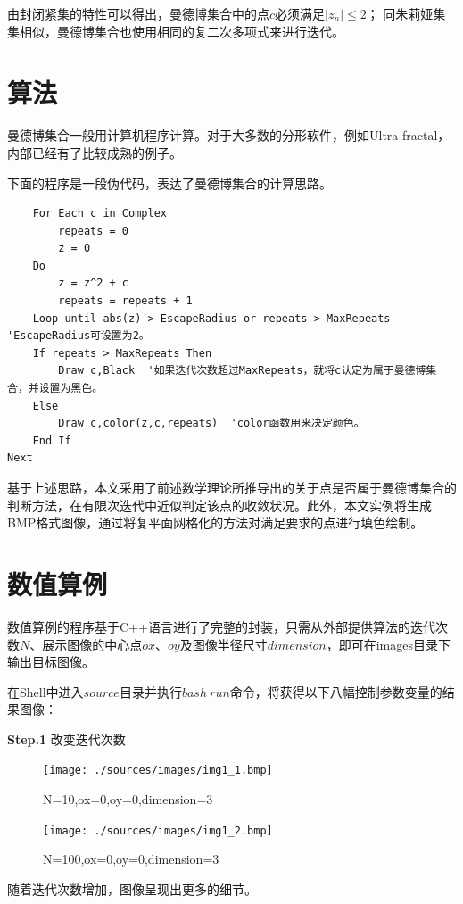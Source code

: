 \documentclass{ctexart}
\begin{document}
由封闭紧集的特性可以得出，曼德博集合中的点$c$必须满足$|z_n|\le 2$；
同朱莉娅集集相似，曼德博集合也使用相同的复二次多项式来进行迭代。

\section{算法}
曼德博集合一般用计算机程序计算。对于大多数的分形软件，例如Ultra fractal，内部已经有了比较成熟的例子。

下面的程序是一段伪代码，表达了曼德博集合的计算思路。

\begin{verbatim}
    For Each c in Complex
        repeats = 0
        z = 0
    Do
        z = z^2 + c
        repeats = repeats + 1
    Loop until abs(z) > EscapeRadius or repeats > MaxRepeats  'EscapeRadius可设置为2。
    If repeats > MaxRepeats Then
        Draw c,Black  '如果迭代次数超过MaxRepeats，就将c认定为属于曼德博集合，并设置为黑色。
    Else
        Draw c,color(z,c,repeats)  'color函数用来决定颜色。
    End If
Next
\end{verbatim}

基于上述思路，本文采用了前述数学理论所推导出的关于点是否属于曼德博集合的判断方法，在有限次迭代中近似判定该点的收敛状况。此外，本文实例将生成BMP格式图像，通过将复平面网格化的方法对满足要求的点进行填色绘制。

\section{数值算例}
数值算例的程序基于C++语言进行了完整的封装，只需从外部提供算法的迭代次数$N$、展示图像的中心点$ox$、$oy$及图像半径尺寸$dimension$，即可在images目录下输出目标图像。

在Shell中进入$source$目录并执行$bash\ run$命令，将获得以下八幅控制参数变量的结果图像：

\textbf{Step.1} 改变迭代次数

\begin{figure}[htb]
\centering
\begin{minipage}{0.48\linewidth}
\centering
\texttt{[image: ./sources/images/img1\_1.bmp]}
\caption{N=10,ox=0,oy=0,dimension=3}
\end{minipage}\hfill
\begin{minipage}{0.48\linewidth}
\centering
\texttt{[image: ./sources/images/img1\_2.bmp]}
\caption{N=100,ox=0,oy=0,dimension=3}
\end{minipage}
\end{figure}

随着迭代次数增加，图像呈现出更多的细节。
\end{document}
